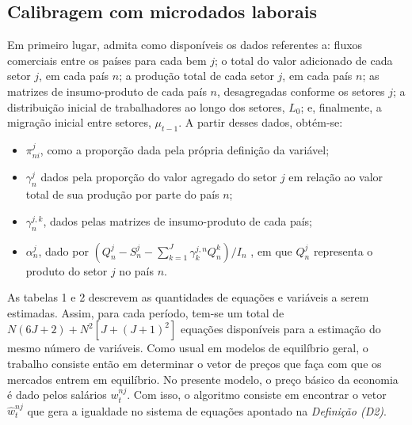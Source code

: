 \documentclass{article}
\begin{document}
\subsection{Calibragem com microdados laborais}

Em primeiro lugar, admita como disponíveis os dados referentes a: fluxos comerciais entre os países para cada bem $j$; o total do valor adicionado de cada setor $j$, em cada país $n$; a produção total de cada setor $j$, em cada país $n$; as matrizes de insumo-produto de cada país $n$, desagregadas conforme os setores $j$; a distribuição inicial de trabalhadores ao longo dos setores, $L_0$; e, finalmente, a migração inicial entre setores, $\mu_{t-1}$. A partir desses dados, obtém-se: 

\begin{itemize}
    \item $\pi_{ni}^j$, como a proporção dada pela própria definição da variável;
    \item $\gamma_n^j$ dados pela proporção do valor agregado do setor $j$ em relação ao valor total de sua produção por parte do país $n$;
    \item $\gamma_n^{j,k}$, dados pelas matrizes de insumo-produto de cada país;
    \item $\alpha_n^j$, dado por $(Q_n^j - S_n^j - \sum_{k=1}^J \gamma_k^{j,n} Q_n^k) / I_n $ , em que $Q_n^j$ representa o produto do setor $j$ no país $n$.
\end{itemize}

As tabelas 1 e 2 descrevem as quantidades de equações e variáveis a serem estimadas.  Assim, para cada período, tem-se um total de $N(6J+2)+N^2 [J+(J+1)^2]$ equações disponíveis para a estimação do mesmo número de variáveis. Como usual em modelos de equilíbrio geral, o trabalho consiste então em determinar o vetor de preços que faça com que os mercados entrem em equilíbrio. No presente modelo, o preço básico da economia é dado pelos salários $w_t^{nj}$. Com isso, o algoritmo consiste em encontrar o vetor $\hat{w}_t^{nj}$ que gera a igualdade no sistema de equações apontado na \textit{Definição (D2)}. \\
\end{document}
